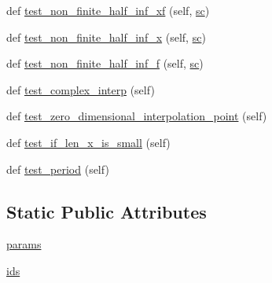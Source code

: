 \begin{DoxyCompactItemize}
\item 
def \hyperlink{classnumpy_1_1lib_1_1tests_1_1test__function__base_1_1TestInterp_a7585a2bdea72ca1616ed729670670352}{test\+\_\+non\+\_\+finite\+\_\+half\+\_\+inf\+\_\+xf} (self, \hyperlink{classnumpy_1_1lib_1_1tests_1_1test__function__base_1_1TestInterp_ab4e8541cde248a5e7352cf3967d9d625}{sc})
\item 
def \hyperlink{classnumpy_1_1lib_1_1tests_1_1test__function__base_1_1TestInterp_a8bf6b0f3cc7a787af225c333d1ceefa6}{test\+\_\+non\+\_\+finite\+\_\+half\+\_\+inf\+\_\+x} (self, \hyperlink{classnumpy_1_1lib_1_1tests_1_1test__function__base_1_1TestInterp_ab4e8541cde248a5e7352cf3967d9d625}{sc})
\item 
def \hyperlink{classnumpy_1_1lib_1_1tests_1_1test__function__base_1_1TestInterp_ae3c0dc29ce4d8691fa7798017c01ec17}{test\+\_\+non\+\_\+finite\+\_\+half\+\_\+inf\+\_\+f} (self, \hyperlink{classnumpy_1_1lib_1_1tests_1_1test__function__base_1_1TestInterp_ab4e8541cde248a5e7352cf3967d9d625}{sc})
\item 
def \hyperlink{classnumpy_1_1lib_1_1tests_1_1test__function__base_1_1TestInterp_a3e6aeb4683b8c085cc52083a5343e0a1}{test\+\_\+complex\+\_\+interp} (self)
\item 
def \hyperlink{classnumpy_1_1lib_1_1tests_1_1test__function__base_1_1TestInterp_a7b15e02509823ed9774e2b5372cdfe97}{test\+\_\+zero\+\_\+dimensional\+\_\+interpolation\+\_\+point} (self)
\item 
def \hyperlink{classnumpy_1_1lib_1_1tests_1_1test__function__base_1_1TestInterp_a58ad2aa79a06292e950f8c5c19e48fd6}{test\+\_\+if\+\_\+len\+\_\+x\+\_\+is\+\_\+small} (self)
\item 
def \hyperlink{classnumpy_1_1lib_1_1tests_1_1test__function__base_1_1TestInterp_a017260bc7a6b90dd6f284064931aacd5}{test\+\_\+period} (self)
\end{DoxyCompactItemize}
\subsection*{Static Public Attributes}
\begin{DoxyCompactItemize}
\item 
\hyperlink{classnumpy_1_1lib_1_1tests_1_1test__function__base_1_1TestInterp_a1a68d18d257b5713a3b4c508c2483472}{params}
\item 
\hyperlink{classnumpy_1_1lib_1_1tests_1_1test__function__base_1_1TestInterp_adbf90ed3432b9c428816fcb560c17967}{ids}
\end{DoxyCompactItemize}


